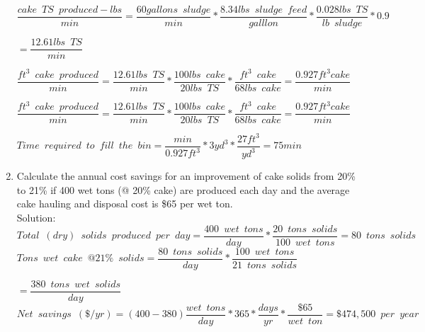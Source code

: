\begin{enumerate}
{$\dfrac{cake \enspace TS \enspace produced - lbs}{min}= \dfrac {60 gallons \enspace sludge}{min}*\dfrac {8.34 lbs \enspace sludge \enspace feed}{galllon}*\dfrac{0.028 lbs \enspace TS}{lb \enspace sludge}*0.9$}\\
\vspace{3mm}

{$=\dfrac{12.61lbs \enspace TS}{min}$}\\
\vspace{3mm}

{$\dfrac{ft^3 \enspace cake \enspace produced}{min}=\dfrac{12.61lbs \enspace TS}{min}*\dfrac{100 lbs \enspace cake}{20lbs \enspace TS}*\dfrac{ft^3 \enspace cake}{68 lbs \enspace cake} = \dfrac{0.927ft^3 cake}{min}$}\\
\vspace{3mm}

{$\dfrac{ft^3 \enspace cake \enspace produced}{min}=\dfrac{12.61lbs \enspace TS}{min}*\dfrac{100 lbs \enspace cake}{20lbs \enspace TS}*\dfrac{ft^3 \enspace cake}{68 lbs \enspace cake} = \dfrac{0.927ft^3 cake}{min}$}\\
\vspace{3mm}

{$Time \enspace required \enspace to \enspace fill \enspace the \enspace bin=\dfrac{min}{0.927ft^3}*{3yd^3}*\dfrac{27ft^3}{yd^3}=\boxed{75min}$}\\
\pagebreak
\item Calculate the annual cost savings for an improvement of cake solids from 20\% to 21\% if 400 wet tons (@ 20\% cake) are produced each day and the average cake hauling and disposal cost is \$65 per wet ton.\\
Solution:\\
{$Total \enspace (dry)\enspace solids \enspace produced \enspace per \enspace day =\dfrac{400 \enspace wet \enspace tons}{day}*\dfrac{20  \enspace tons \enspace solids}{100  \enspace wet \enspace tons}={80  \enspace tons \enspace solids}$}\\
\vspace{3mm}
{$Tons \enspace wet \enspace cake \enspace@ 21\% \enspace solids =\dfrac{80 \enspace tons \enspace solids}{day}*\dfrac{100  \enspace wet \enspace tons}{21  \enspace tons \enspace solids}$}

\vspace{3mm}
{$=\dfrac{380  \enspace tons \enspace  wet \enspace solids}{day}$}\\
\vspace{3mm}
{$Net \enspace savings \enspace (\$/yr) = (400 - 380)\dfrac{wet \enspace tons}{day}*365*\dfrac{days}{yr}*\dfrac{\$65}{wet \enspace ton}=\boxed{\$474,500 \enspace per  \enspace year}$}



\end{enumerate}
